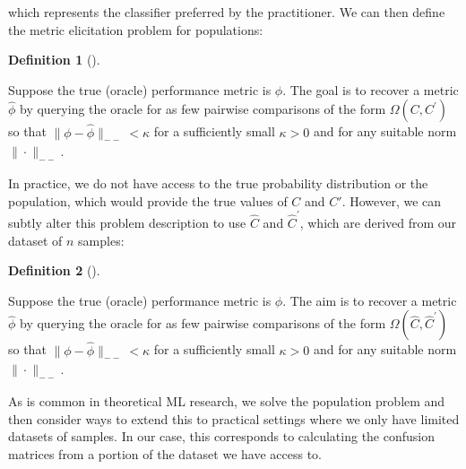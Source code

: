 \documentclass[
  letterpaper,
  numbers=noenddot,
  DIV=11]{scrreprt}
\theoremstyle{definition}
\newtheorem{definition}{Definition}[chapter]
\theoremstyle{plain}
\theoremstyle{plain}
\theoremstyle{remark}
\begin{document}
which represents the classifier preferred by the practitioner. We can
then define the metric elicitation problem for populations:

\begin{tcolorbox}[colframe=.grey, title=\faPenSquare \enspace Definition]

\begin{definition}[]\protect\hypertarget{def-def3.1}{}\label{def-def3.1}

Suppose the true (oracle) performance metric is \(\phi\). The goal is to
recover a metric \(\hat{\phi}\) by querying the oracle for as few
pairwise comparisons of the form \(\Omega\left(C, C^{\prime}\right)\) so
that \(\|\phi - \hat{\phi}\|_{--} < \kappa\) for a sufficiently small
\(\kappa > 0\) and for any suitable norm \(\|\cdot\|_{--}\).

\end{definition}

\end{tcolorbox}

In practice, we do not have access to the true probability distribution
or the population, which would provide the true values of \(C\) and
\(C'\). However, we can subtly alter this problem description to use
\(\hat{C}\) and \(\hat{C}^{\prime}\), which are derived from our dataset
of \(n\) samples:

\begin{tcolorbox}[colframe=.grey, title=\faPenSquare \enspace Definition]

\begin{definition}[]\protect\hypertarget{def-def3.2}{}\label{def-def3.2}

Suppose the true (oracle) performance metric is \(\phi\). The aim is to
recover a metric \(\hat{\phi}\) by querying the oracle for as few
pairwise comparisons of the form
\(\Omega\left(\hat{C}, \hat{C}^{\prime}\right)\) so that
\(\|\phi - \hat{\phi}\|_{--} < \kappa\) for a sufficiently small
\(\kappa > 0\) and for any suitable norm \(\|\cdot\|_{--}\).

\end{definition}

\end{tcolorbox}

As is common in theoretical ML research, we solve the population problem
and then consider ways to extend this to practical settings where we
only have limited datasets of samples. In our case, this corresponds to
calculating the confusion matrices from a portion of the dataset we have
access to.
\end{document}
